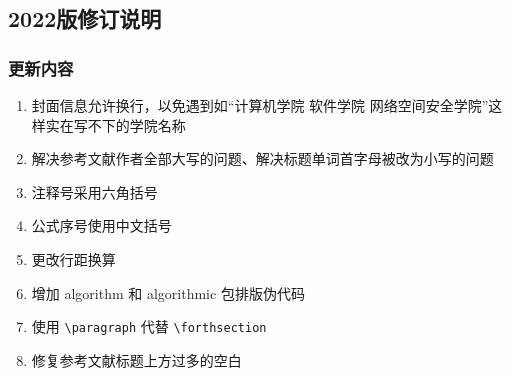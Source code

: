 \subsection*{2022版修订说明}

\subsubsection*{更新内容}

\begin{enumerate}[1、]
    \item 封面信息允许换行，以免遇到如“计算机学院 软件学院 网络空间安全学院”这样实在写不下的学院名称
    \item 解决参考文献作者全部大写的问题、解决标题单词首字母被改为小写的问题
    \item 注释号采用六角括号
    \item 公式序号使用中文括号
    \item 更改行距换算
    \item 增加 algorithm 和 algorithmic 包排版伪代码
    \item 使用 \verb|\paragraph| 代替 \verb|\forthsection|
    \item 修复参考文献标题上方过多的空白
\end{enumerate}

